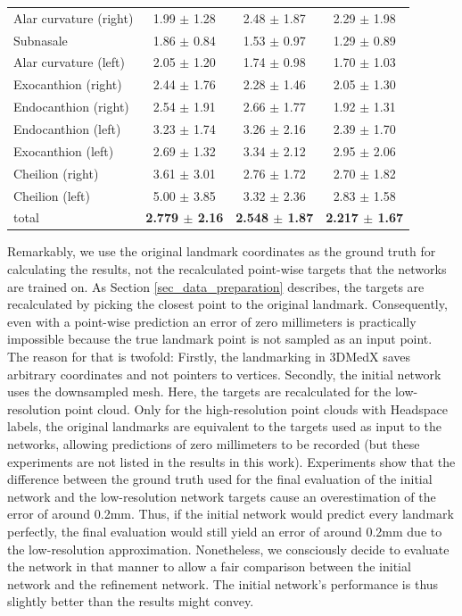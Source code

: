 \documentclass[class=article, crop=false]{standalone}
\begin{document}
\begin{table}[!htbp]
\begin{tabularx}{\textwidth}{l|c|c|c}
Alar curvature (right) & 1.99 $\pm$ 1.28 & 2.48 $\pm$ 1.87 & 2.29 $\pm$ 1.98\\
Subnasale              & 1.86 $\pm$ 0.84 & 1.53 $\pm$ 0.97 & 1.29 $\pm$ 0.89\\
Alar curvature (left)  & 2.05 $\pm$ 1.20 & 1.74 $\pm$ 0.98 & 1.70 $\pm$ 1.03\\   
Exocanthion (right)    & 2.44 $\pm$ 1.76 & 2.28 $\pm$ 1.46 & 2.05 $\pm$ 1.30\\ 
Endocanthion (right)   & 2.54 $\pm$ 1.91 & 2.66 $\pm$ 1.77 & 1.92 $\pm$ 1.31\\ 
Endocanthion (left)    & 3.23 $\pm$ 1.74 & 3.26 $\pm$ 2.16 & 2.39 $\pm$ 1.70\\
Exocanthion (left)     & 2.69 $\pm$ 1.32 & 3.34 $\pm$ 2.12 & 2.95 $\pm$ 2.06\\
Cheilion (right)       & 3.61 $\pm$ 3.01 & 2.76 $\pm$ 1.72 & 2.70 $\pm$ 1.82\\
Cheilion (left)        & 5.00 $\pm$ 3.85 & 3.32 $\pm$ 2.36 & 2.83 $\pm$ 1.58\\

\bottomrule
total & \textbf{2.779 $\pm$ 2.16} & \textbf{2.548 $\pm$ 1.87} & \textbf{2.217 $\pm$ 1.67}
\end{tabularx}
\end{table}


Remarkably, we use the original landmark coordinates as the ground truth for calculating the results, not the recalculated point-wise targets that the networks are trained on. As Section \ref{sec_data_preparation} describes, the targets are recalculated by picking the closest point to the original landmark. Consequently, even with a point-wise prediction an error of zero millimeters is practically impossible because the true landmark point is not sampled as an input point. The reason for that is twofold: Firstly, the landmarking in 3DMedX saves arbitrary coordinates and not pointers to vertices. Secondly, the initial network uses the downsampled mesh. Here, the targets are recalculated for the low-resolution point cloud. Only for the high-resolution point clouds with Headspace labels, the original landmarks are equivalent to the targets used as input to the networks, allowing predictions of zero millimeters to be recorded (but these experiments are not listed in the results in this work). Experiments show that the difference between the ground truth used for the final evaluation of the initial network and the low-resolution network targets cause an overestimation of the error of around 0.2mm. Thus, if the initial network would predict every landmark perfectly, the final evaluation would still yield an error of around 0.2mm due to the low-resolution approximation. Nonetheless, we consciously decide to evaluate the network in that manner to allow a fair comparison between the initial network and the refinement network. The initial network's performance is thus slightly better than the results might convey.
\end{document}
